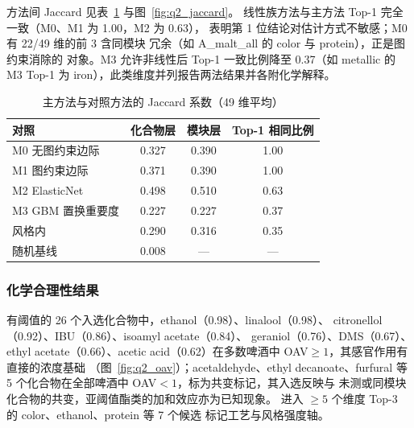 \documentclass[12pt,a4paper]{article}
\begin{document}

方法间 Jaccard 见表~\ref{tab:jaccard} 与图~\ref{fig:q2_jaccard}。
线性族方法与主方法 Top-1 完全一致（M0、M1 为 1.00，M2 为 0.63），
表明第 1 位结论对估计方式不敏感；M0 有 22/49 维的前 3 含同模块
冗余（如 A\_malt\_all 的 color 与 protein），正是图约束消除的
对象。M3 允许非线性后 Top-1 一致比例降至 0.37（如 metallic 的
M3 Top-1 为 iron），此类维度并列报告两法结果并各附化学解释。

\begin{table}[!htbp]
  \centering\small
  \caption{主方法与对照方法的 Jaccard 系数（49 维平均）}
  \label{tab:jaccard}
  \begin{tabular}{lccc}
    \toprule
    对照 & 化合物层 & 模块层 & Top-1 相同比例 \\
    \midrule
    M0 无图约束边际 & 0.327 & 0.390 & 1.00 \\
    M1 图约束边际 & 0.371 & 0.390 & 1.00 \\
    M2 ElasticNet & 0.498 & 0.510 & 0.63 \\
    M3 GBM 置换重要度 & 0.227 & 0.227 & 0.37 \\
    风格内 & 0.290 & 0.316 & 0.35 \\
    随机基线 & 0.008 & --- & --- \\
    \bottomrule
  \end{tabular}
\end{table}


\subsubsection{化学合理性结果}

有阈值的 26 个入选化合物中，ethanol（0.98）、linalool（0.98）、
citronellol（0.92）、IBU（0.86）、isoamyl acetate（0.84）、
geraniol（0.76）、DMS（0.67）、ethyl acetate（0.66）、acetic
acid（0.62）在多数啤酒中 OAV$\ge1$，其感官作用有直接的浓度基础
（图~\ref{fig:q2_oav}）；acetaldehyde、ethyl decanoate、furfural
等 5 个化合物在全部啤酒中 OAV$<1$，标为共变标记，其入选反映与
未测或同模块化合物的共变，亚阈值酯类的加和效应亦为已知现象。
进入 $\ge5$ 个维度 Top-3 的 color、ethanol、protein 等 7 个候选
标记工艺与风格强度轴。
\end{document}
